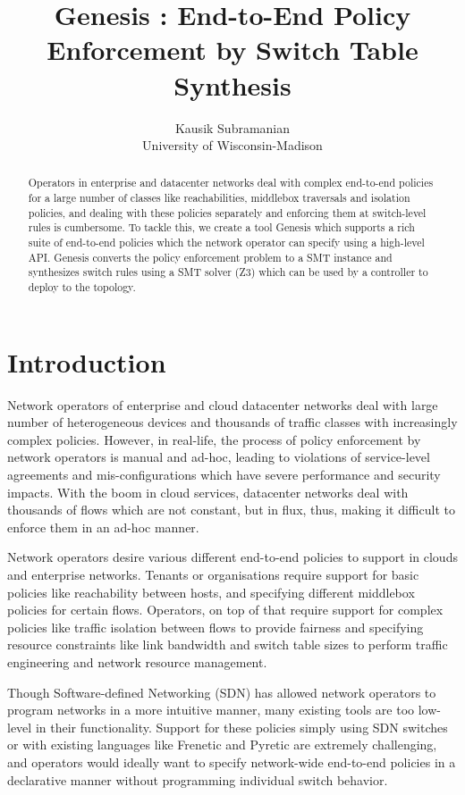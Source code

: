 \documentclass[]{sig}
\title{Genesis : End-to-End Policy Enforcement by Switch Table Synthesis }
\author{Kausik Subramanian \\
	University of Wisconsin-Madison}
\begin{document}
\maketitle

\begin{abstract}
Operators in enterprise and datacenter networks deal with complex end-to-end policies for a large number of classes like reachabilities, middlebox traversals and isolation policies, and dealing with these policies separately and enforcing them at switch-level rules is cumbersome. To tackle this, we create a tool Genesis which supports a rich suite of end-to-end policies which the network operator can specify using a high-level API. Genesis converts the policy enforcement problem to a SMT instance and synthesizes switch rules using a SMT solver (Z3) which can be used by a controller to deploy to the topology.
\end{abstract}

\section{Introduction}
Network operators of enterprise and cloud datacenter networks deal with large number of heterogeneous devices and thousands of traffic classes with increasingly complex policies. However, in real-life, the process of policy enforcement by network operators is manual and ad-hoc, leading to violations of service-level agreements and mis-configurations which have severe performance and security impacts. With the boom in cloud services, datacenter networks deal with thousands of flows which are not constant, but in flux, thus, making it difficult to enforce them in an ad-hoc manner. 

Network operators desire various different end-to-end policies to support in clouds and enterprise networks. Tenants or organisations require support for basic policies like reachability between hosts, and specifying different middlebox policies for certain flows. Operators, on top of that require support for complex policies like traffic isolation between flows to provide fairness and specifying resource constraints like link bandwidth and switch table sizes to perform traffic engineering and network resource management. 

Though Software-defined Networking (SDN) has allowed network operators to program networks in a more intuitive manner, many existing tools are too low-level in their functionality. Support for these policies simply using SDN switches or with existing languages like Frenetic and Pyretic are extremely challenging, and operators would ideally want to specify network-wide end-to-end policies in a declarative manner without programming individual switch behavior. 
\end{document}
